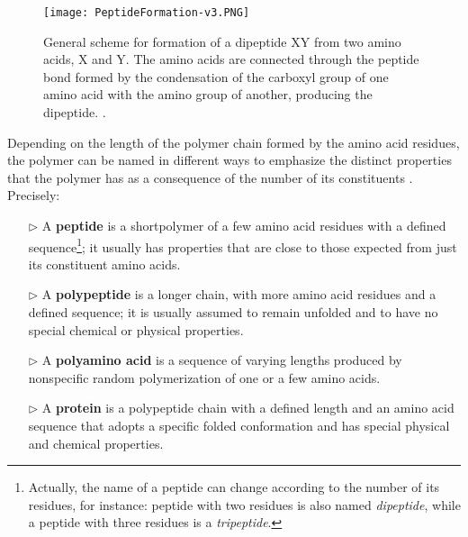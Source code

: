
\begin{figure}[h]
\centering
\begin{minipage}[t]{\textwidth}
\centering
\texttt{[image: PeptideFormation-v3.PNG]}

\caption{\small{General scheme for formation of a dipeptide XY from two amino acids, X and Y. The amino acids are connected through the peptide bond formed by the condensation of the carboxyl group of one amino acid with the amino group of another, producing the dipeptide. 
\cite{creighton2010biophysical}.
}}

\label{fig:PeptideFormation}
\end{minipage} 
\end{figure}

Depending on the length of the polymer chain formed by the amino acid residues, the polymer can be named in different ways to emphasize the distinct properties that the polymer has as a consequence of the number of its constituents
\cite{creighton2010biophysical}.
Precisely:
\begin{itemize}
\item[$\triangleright$] A \textbf{peptide} is a shortpolymer of a few amino acid residues with a defined sequence\footnote{Actually, the name of a peptide can change according to the number of its residues, for instance: peptide with two residues is also named \textit{dipeptide}, while a peptide with three residues is a \textit{tripeptide}.}; it usually has properties that are close to those expected from just its constituent amino acids.
\item[$\triangleright$] A \textbf{polypeptide} is a longer chain, with more amino acid residues and a defined sequence; it is usually assumed to remain unfolded and to have no special chemical or physical properties. 
\item[$\triangleright$] A \textbf{polyamino acid} is a sequence of varying lengths produced by nonspecific random polymerization of one or a few amino acids.
\item[$\triangleright$] A \textbf{protein} is a polypeptide chain with a defined length and an amino acid sequence that adopts a specific folded conformation and has special physical and chemical properties.
\end{itemize}

